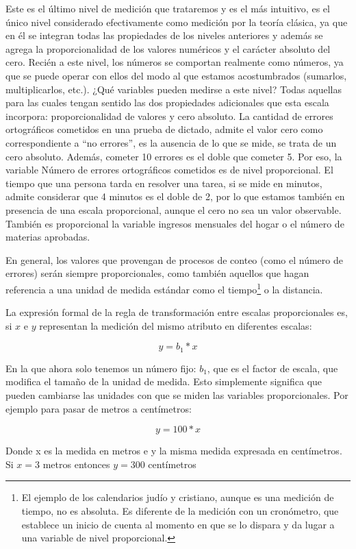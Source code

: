 \documentclass[]{book}
\let\rmarkdownfootnote\footnote%
\def\footnote{\protect\rmarkdownfootnote}
\begin{document}
Este es el último nivel de medición que trataremos y es el más intuitivo, es el único nivel considerado efectivamente como medición por la teoría clásica, ya que en él se integran todas las propiedades de los niveles anteriores y además se agrega la proporcionalidad de los valores numéricos y el carácter absoluto del cero. Recién a este nivel, los números se comportan realmente como números, ya que se puede operar con ellos del modo al que estamos acostumbrados (sumarlos, multiplicarlos, etc.). ¿Qué variables pueden medirse a este nivel? Todas aquellas para las cuales tengan sentido las dos propiedades adicionales que esta escala incorpora: proporcionalidad de valores y cero absoluto. La cantidad de errores ortográficos cometidos en una prueba de dictado, admite el valor cero como correspondiente a ``no errores'', es la ausencia de lo que se mide, se trata de un cero absoluto. Además, cometer 10 errores es el doble que cometer 5. Por eso, la variable Número de errores ortográficos cometidos es de nivel proporcional. El tiempo que una persona tarda en resolver una tarea, si se mide en minutos, admite considerar que 4 minutos es el doble de 2, por lo que estamos también en presencia de una escala proporcional, aunque el cero no sea un valor observable. También es proporcional la variable ingresos mensuales del hogar o el número de materias aprobadas.

En general, los valores que provengan de procesos de conteo (como el número de errores) serán siempre proporcionales, como también aquellos que hagan referencia a una unidad de medida estándar como el tiempo\footnote{El ejemplo de los calendarios judío y cristiano, aunque es una medición de tiempo, no es absoluta. Es diferente de la medición con un cronómetro, que establece un inicio de cuenta al momento en que se lo dispara y da lugar a una variable de nivel proporcional.} o la distancia.

La expresión formal de la regla de transformación entre escalas proporcionales es, si \(x\) e \(y\) representan la medición del mismo atributo en diferentes escalas:

\[y = b_1 * x\]

En la que ahora solo tenemos un número fijo: \(b_1\), que es el factor de escala, que modifica el tamaño de la unidad de medida. Esto simplemente significa que pueden cambiarse las unidades con que se miden las variables proporcionales. Por ejemplo para pasar de metros a centímetros:

\[y = 100 * x\]

Donde x es la medida en metros e y la misma medida expresada en centímetros. Si \(x=3\) metros entonces \(y=300\) centímetros
\end{document}

